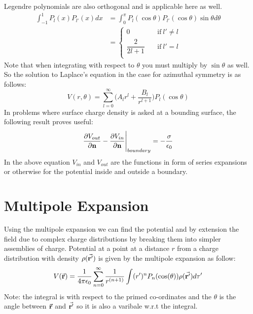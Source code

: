 \documentclass[12pt, oneside]{book}
\begin{document}
Legendre polynomials are also orthogonal and  is applicable here as well. 
\begin{align}
	\int_{-1}^{1}P_l(x)P_{l'}(x)dx&=\int_{0}^{\pi}P_l(\cos\theta)P_{l'}(\cos\theta)\sin{\theta} d\theta \\
	                              &=\begin{cases}
	                              	0  \quad &\text{if} \ l'\neq l\\
	                              	\dfrac{2}{2l+1} \quad &\text{if} \ l'=l \\
	                              \end{cases} 
\end{align}
Note that when integrating with respect to $\theta$ you must multiply by $\sin\theta$ as well. So the solution to Laplace's equation in the case for azimuthal symmetry is as follows:
\begin{equation}
	V(r,\theta)=\sum_{l=0}^{\infty}\Big(A_lr^l+\dfrac{B_l}{r^{l+1}}\Big)P_l(\cos\theta)
\end{equation}
In problems where surface charge density is asked at a bounding surface, the following result proves useful:
\begin{equation}
	 \pdv{V_{out}}{\textbf{n}}-\pdv{V_{in}}{\textbf{n}}\Bigg|_{boundary}=-\dfrac{\sigma}{\epsilon_0}
\end{equation}
In the above equation $V_{in}$ and $V_{out}$ are the functions in form of series expansions or otherwise for the potential inside and outside a boundary.


\section{Multipole Expansion}
Using the multipole expansion we can find the potential and by extension the field due to complex charge distributions by breaking them into simpler assemblies of charge. Potential at a point at a distance $r$ from a charge distribution with density $\rho(\va{r'})$ is given by the multipole expansion as follow:
\begin{equation}
	V(\va{r})=\dfrac{1}{4\pi \epsilon_0}\sum_{n=0}^{\infty}\dfrac{1}{r^{(n+1)}}\int (r')^nP_n(\cos(\theta))\rho(\va{r'})d\tau'
\end{equation}
Note: the integral is with respect to the primed co-ordinates and the $\theta$ is the angle between $\va{r}$ and $\va{r'}$ so it is also a varibale w.r.t the integral. \\
\end{document}
